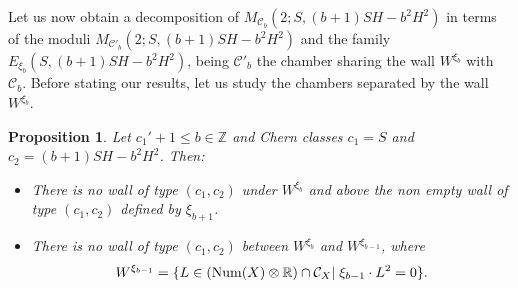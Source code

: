\documentclass[11pt,twoside]{amsart}
\newtheorem{proposition}[theorem]{Proposition}
\theoremstyle{definition}
\newcommand{\Num}{\operatorname{Num}}
\begin{document}
Let us now obtain a decomposition of $M_{\mathcal{C}_b}(2;S, (b+1)SH-b^2H^2)$ in terms of the moduli $M_{\mathcal{C}'_b}(2;S, (b+1)SH-b^2H^2)$ and the family $E_{\xi_b}(S, (b+1)SH-b^2H^2)$, being $\mathcal{C}'_b$  the chamber sharing the wall $W^{\xi_b}$ with $\mathcal{C}_b$.
Before stating our results, let us study the chambers separated by the wall $W^{\xi_b}$.






\begin{proposition}
\label{limit_wall}
 Let  $c_1'+1\leq b\in\mathbb{Z}$ and Chern classes $c_1=S$ and $c_2=(b+1)SH-b^2H^2$.     %
 Then:
 \begin{itemize}
     \item[1)]
 There is no wall  of type $(c_1,c_2)$ under $W^{\xi_b}$ and above the non empty wall of type $(c_1,c_2)$ defined by $\xi_{b+1}$.
     \item[2)] 
 There is no wall  of type $(c_1,c_2)$ between $W^{\xi_b}$ and $W^{\xi_{b-1}}$, where $$W^{\xi_{b-1}}=\{L\in(\Num(X)\otimes\mathbb{R})\cap\mathcal{C}_X|\thickspace \xi_{b-1}\cdot L^2=0\}.$$ 
 \end{itemize}
 
\end{proposition}
\end{document}

